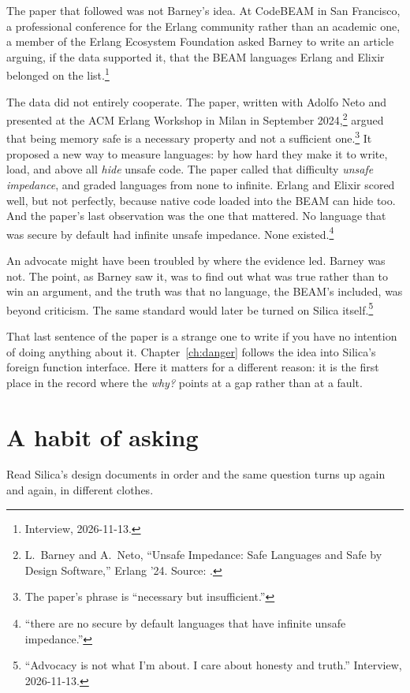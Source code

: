 The paper that followed was not Barney's idea. At CodeBEAM in San Francisco, a
professional conference for the Erlang community rather than an academic one,
a member of the Erlang Ecosystem Foundation asked Barney to write an article
arguing, if the data supported it, that the BEAM languages Erlang and Elixir
belonged on the list.\footnote{Interview, 2026-11-13.}

The data did not entirely cooperate. The paper, written with Adolfo Neto and
presented at the ACM Erlang Workshop in Milan in September
2024,\footnote{L.~Barney and A.~Neto, ``Unsafe Impedance: Safe Languages and
Safe by Design Software,'' Erlang '24. Source:
.} argued that being
memory safe is a necessary property and not a sufficient
one.\footnote{The paper's phrase is ``necessary but insufficient.''} It proposed
a new way to measure languages: by how hard they make it to write, load, and
above all \emph{hide} unsafe code. The paper called that difficulty
\emph{unsafe impedance}, and graded languages from none to infinite. Erlang and
Elixir scored well, but not perfectly, because native code loaded into the BEAM
can hide too. And the paper's last observation was the one that mattered. No
language that was secure by default had infinite unsafe impedance. None
existed.\footnote{``there are no secure by default languages that have
infinite unsafe impedance.''}

An advocate might have been troubled by where the evidence led. Barney was not.
The point, as Barney saw it, was to find out what was true rather than to win
an argument, and the truth was that no language, the BEAM's included, was beyond
criticism. The same standard would later be turned on Silica
itself.\footnote{``Advocacy is not what I'm about. I care about honesty and
truth.'' Interview, 2026-11-13.}

That last sentence of the paper is a strange one to write if you have no
intention of doing anything about it. Chapter~\ref{ch:danger} follows the idea
into Silica's foreign function interface. Here it matters for a different
reason: it is the first place in the record where the \emph{why?} points at a
gap rather than at a fault.

\section{A habit of asking}

Read Silica's design documents in order and the same question turns up again
and again, in different clothes.

